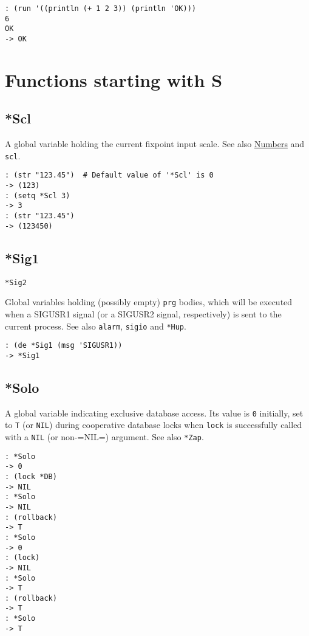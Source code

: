 {{{{{{{{\begin{verbatim}
: (run '((println (+ 1 2 3)) (println 'OK)))
6
OK
-> OK
\end{verbatim}


\chapter{Functions starting with S}
\label{sec-8-1-19}


 
\section{*Scl}
\label{sec-8-1-19-1}


A global variable holding the current fixpoint input scale. See also
\hyperref[ref.html-num-io]{Numbers} and \texttt{scl}.


\begin{verbatim}
: (str "123.45")  # Default value of '*Scl' is 0
-> (123)
: (setq *Scl 3)
-> 3
: (str "123.45")
-> (123450)
\end{verbatim}

 
\section{*Sig1}
\label{sec-8-1-19-2}


\texttt{*Sig2}

Global variables holding (possibly empty) \texttt{prg} bodies, which will be
executed when a SIGUSR1 signal (or a SIGUSR2 signal, respectively) is
sent to the current process. See also \texttt{alarm}, \texttt{sigio} and \texttt{*Hup}.


\begin{verbatim}
: (de *Sig1 (msg 'SIGUSR1))
-> *Sig1
\end{verbatim}

 
\section{*Solo}
\label{sec-8-1-19-3}


A global variable indicating exclusive database access. Its value is \texttt{0}
initially, set to \texttt{T} (or \texttt{NIL}) during cooperative database locks when
\texttt{lock} is successfully called with a \texttt{NIL} (or non-=NIL=) argument. See
also \texttt{*Zap}.


\begin{verbatim}
: *Solo
-> 0
: (lock *DB)
-> NIL
: *Solo
-> NIL
: (rollback)
-> T
: *Solo
-> 0
: (lock)
-> NIL
: *Solo
-> T
: (rollback)
-> T
: *Solo
-> T
\end{verbatim}

}}}}}}}}
